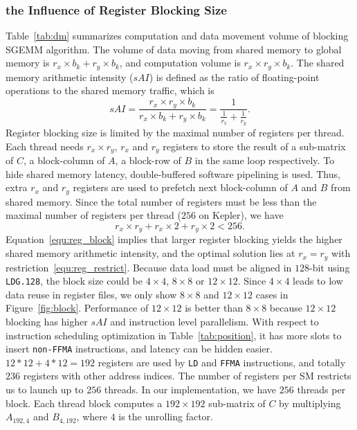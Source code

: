 \subsubsection{the Influence of Register Blocking Size}
Table~\ref{tab:dm} summarizes computation and data movement volume of blocking SGEMM algorithm.
The volume of data moving from shared memory to global memory is $r_x\times b_k+ r_y\times b_k$, and computation volume is $r_x\times r_y\times b_k$. 
The shared memory arithmetic intensity ($sAI$) is defined as the ratio of floating-point operations to the shared memory traffic, which is 
\begin{equation}
sAI = \frac {r_x\times 
r_y\times b_k} {r_x\times b_k+ r_y\times b_k} = \frac{1}{\frac{1}{r_x} + \frac{1}{r_y}}.
    \label{equ:reg_block}
\end{equation}
Register blocking size is limited by the maximal number of registers per thread. 
Each thread needs $r_x\times r_y$, $r_x$ and $r_y$ registers to store the result of a sub-matrix of $C$,  a block-column of
$A$,  a block-row of $B$ in the same loop respectively.
To hide shared memory latency, double-buffered software pipelining is used. Thus, extra $r_x$ and $r_y$ registers
are used to prefetch next block-column of $A$ and $B$ from shared memory. 
Since the total number of registers must be less than the maximal number of registers per thread ($256$ on Kepler), we have
\begin{equation}
    r_x\times r_y + r_x\times 2 + r_y\times 2 < 256.
\label{equ:reg_restrict}
\end{equation}
Equation~\ref{equ:reg_block} implies that larger register blocking yields the higher shared memory arithmetic intensity,
and the optimal solution lies at $r_x=r_y$ with restriction~\ref{equ:reg_restrict}. 
Because data load must be aligned in $128$-bit using 
{\tt LDG.128}, the block size could be $4\times 4$, $8\times 8$ or $12\times 12$. 
Since $4\times 4$ leads to low data reuse in register files, we only show $8\times8$ and $12\times12$ cases in Figure~\ref{fig:block}.
Performance of $12\times12$ is better than $8\times8$ because $12\times12$ blocking has higher $sAI$ and instruction
level parallelism. With respect to 
instruction scheduling optimization in Table~\ref{tab:position}, it has more slots to insert {\tt non-FFMA}
instructions, and latency can be hidden easier.
$12*12+4*12=192$ registers are used by {\tt LD} and {\tt FFMA} instructions, and totally $236$ registers with
other address indices. The number of registers per SM restricts us to launch up to $256$ threads. 
In our implementation, we have $256$ threads per block. 
Each thread block computes a $192\times 192$ sub-matrix of $C$ by multiplying $A_{192,4}$ and $B_{4, 192}$, where $4$ is the unrolling factor.

